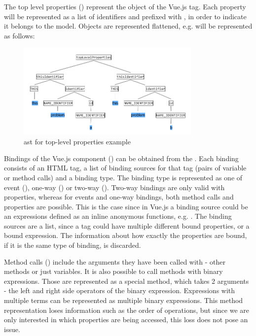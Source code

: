 The top level properties () represent the  object of the Vue.js  tag. Each property will be represented as a list of identifiers and prefixed with , in order to indicate it belongs to the model. Objects are represented flattened, e.g.  will be represented as follows:

\begin{figure}[H]
    \centering
    \includegraphics[width=0.8\textwidth]{images/ast_top_level.png}
     \caption{\gls{ast} for top-level properties example }
     \label{fig:ast_top_level}
\end{figure}

Bindings of the Vue.js component () can be obtained from the . Each binding consists of an HTML tag, a list of binding sources for that tag (pairs of variable or method calls) and a binding type. The binding type is represented as one of event (), one-way () or two-way (). Two-way bindings are only valid with properties, whereas for events and one-way bindings, both method calls and properties are possible. This is the case since in Vue.js a binding source could be an expressions defined as an inline anonymous functions, e.g.
. The binding sources are a list, since a tag could have multiple different bound properties, or a bound expression. The information about how exactly the properties are bound, if it is the same type of binding, is discarded.

Method calls () include the arguments they have been called with - other methods or just variables. It is also possible to call methods with binary expressions. Those are represented as a special method, which takes 2 arguments - the left and right side operators of the binary expression. Expressions with multiple terms can be represented as multiple binary expressions. This method representation loses information such as the order of operations, but since we are only interested in which properties are being accessed, this loss does not pose an issue.

